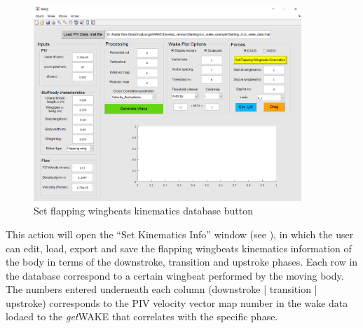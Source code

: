 \documentclass[12pt,a4paper]{article}
\begin{document}
\begin{figure}[ht!]
	\centering
	\includegraphics[width=0.9\textwidth]{set-kinematics-database}
	\caption{Set flapping wingbeats kinematics database button}
	\label{fig:GUI-set-kinematics-database}
\end{figure}


This action will open the ``Set Kinematics Info'' window (see ), in which the user can edit, load, export and save the flapping wingbeats kinematics information of the body in terms of the downstroke, transition and upstroke phases.
Each row in the database correspond to a certain wingbeat performed by the moving body. 
The numbers entered underneath each column (downstroke | transition | upstroke) corresponds to the PIV velocity vector map number in the wake data lodaed to the \textit{get}WAKE that correlates with the specific phase.
\end{document}
